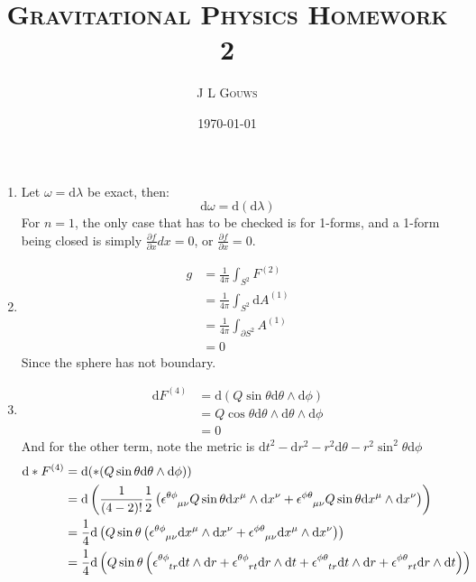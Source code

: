 \documentclass[12pt,a4]{article}
\title{
\textsc{Gravitational Physics Homework 2}
}
\author{\textsc{J L Gouws}
}
\date{\today
\\[1cm]}
\newcommand{\e}{\mathrm{d}}
\begin{document}
\thispagestyle{empty}

\maketitle

\begin{enumerate}
  \item
    Let $\omega = \e \lambda$ be exact, then:
    \begin{equation*}
      \e \omega = \e( \e \lambda )
    \end{equation*}
    For $n = 1$, the only case that has to be checked is for 1-forms, and a 1-form being closed is simply $\frac{\partial f}{\partial x} dx = 0$, or  $\frac{\partial f}{\partial x} = 0$.
  \item
    \begin{align*}
      g &= \frac{1}{4 \pi } \int_{S^2} F^{(2)} \\
        &= \frac{1}{4 \pi } \int_{S^2} \e A^{(1)} \\
        &= \frac{1}{4 \pi } \int_{\partial S^2} A^{(1)} \\
        &= 0 
    \end{align*}
    Since the sphere has not boundary.
  \item
    \begin{align*}
      \e F^{(4)} &= \e (Q \sin \theta \e \theta \wedge \e \phi)\\
                 &= Q \cos \theta \e \theta \wedge \e \theta \wedge \e \phi\\
                 &= 0 
    \end{align*}
    And for the other term, note the metric is $\e t^2 - \e r^2 - r^2 \e \theta - r^2 \sin^2 \theta \e \phi$
    \begin{align*}
      \e * F^{(4)} &= \e (* (Q \sin \theta \e \theta \wedge \e \phi))\\
                   &= \e \left(\frac{1}{(4 - 2)!}\frac{1}{2} \left(\tensor{\epsilon}{^\theta ^\phi_\mu_\nu} Q \sin \theta \e x^\mu \wedge \e x^\nu + \tensor{\epsilon}{^\phi^\theta _\mu_\nu} Q \sin \theta \e x^\mu \wedge \e x^\nu\right)\right)\\
                   &= \frac{1}{4}\e \left(Q \sin \theta \left(\tensor{\epsilon}{^\theta ^\phi_\mu_\nu}  \e x^\mu \wedge \e x^\nu + \tensor{\epsilon}{^\phi^\theta _\mu_\nu} \e x^\mu \wedge \e x^\nu\right)\right)\\
                   &= \frac{1}{4}\e \left(Q \sin \theta \left( \tensor{\epsilon}{^\theta ^\phi_t_r} \e t \wedge \e r + \tensor{\epsilon}{^\theta ^\phi_r_t} \e r \wedge \e t + \tensor{\epsilon}{^\phi^\theta _t_r} \e t \wedge \e r + \tensor{\epsilon}{^\phi^\theta _r_t} \e r \wedge \e t\right)\right)

\end{align*}
\end{enumerate}
\end{document}
